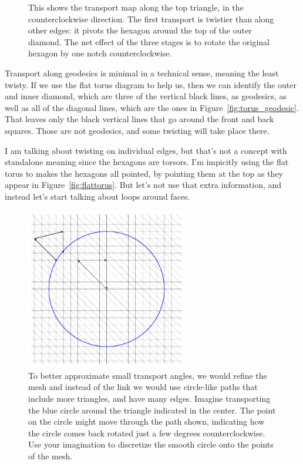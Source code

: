 \begin{figure}[htbp]
\centering




\caption{This shows the transport map along the top triangle, in the counterclockwise direction. The first transport is twistier than along other edges: it pivots the hexagon around the top of the outer diamond. The net effect of the three stages is to rotate the original hexagon by one notch counterclockwise.}
\label{fig:torus_twist}
\end{figure}

Transport along geodesics is minimal in a technical sense, meaning the least twisty. If we use the flat torus diagram to help us, then we can identify the outer and inner diamond, which are three of the vertical black lines, as geodesics, as well as all of the diagonal lines, which are the ones in Figure~\ref{fig:torus_geodesic}. That leaves only the black vertical lines that go around the front and back squares. Those are not geodesics, and some twisting will take place there.

I am talking about twisting on individual edges, but that's not a concept with standalone meaning since the hexagons are torsors. I'm impicitly using the flat torus to makes the hexagons all pointed, by pointing them at the top as they appear in Figure~\ref{fig:flattorus}. But let's not use that extra information, and instead let's start talking about loops around faces.

\begin{figure}[htbp]
\centering
\includegraphics[width=200pt]{dense_circle.pdf}
\caption{To better approximate small transport angles, we would refine the mesh and instead of the link we would use circle-like paths that include more triangles, and have many edges. Imagine transporting the blue circle around the triangle indicated in the center. The point on the circle might move through the path shown, indicating how the circle comes back rotated just a few degrees counterclockwise. Use your imagination to discretize the smooth circle onto the points of the mesh.}
\label{fig:dense_circle}
\end{figure}



